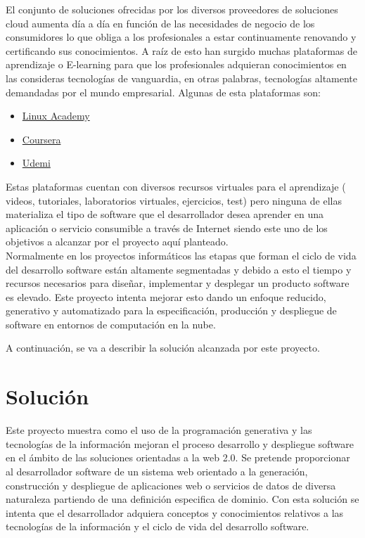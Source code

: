 \documentclass[a4paper,11pt]{book}
\begin{document}
El conjunto de soluciones ofrecidas por los diversos proveedores de soluciones cloud aumenta día a día en función de las necesidades de negocio de los consumidores lo que obliga a los profesionales a estar continuamente renovando y certificando sus conocimientos. A raíz de esto han surgido muchas plataformas de aprendizaje o E-learning para que los profesionales adquieran conocimientos en las consideras tecnologías de vanguardia,  en otras palabras, tecnologías altamente demandadas por el mundo empresarial. Algunas de esta plataformas son:

\begin{itemize}
\item \href{https://linuxacademy.com/}{Linux Academy}
\item \href{https://es.coursera.org/}{Coursera}
\item \href{https://www.udemy.com}{Udemi}
\end{itemize}

Estas plataformas cuentan con diversos recursos virtuales para el aprendizaje ( videos, tutoriales, laboratorios virtuales, ejercicios, test) pero ninguna de ellas materializa el tipo de software que el desarrollador desea aprender en una aplicación o servicio consumible a través de Internet siendo este uno de los objetivos a alcanzar por el proyecto aquí planteado. \\


Normalmente en los proyectos informáticos las etapas que forman el ciclo de vida del desarrollo software están altamente segmentadas y debido a esto el tiempo y recursos necesarios para diseñar, implementar y desplegar un producto software es elevado.  Este proyecto intenta mejorar esto dando un enfoque reducido, generativo y automatizado para la especificación, producción y despliegue de software en entornos de computación en la nube.  

A continuación, se va a describir la solución alcanzada por este proyecto. 

\section{Solución}

Este proyecto muestra como el uso de la programación generativa y las tecnologías de la información mejoran el proceso desarrollo y despliegue software en el ámbito de las soluciones orientadas a la web 2.0. Se pretende proporcionar al desarrollador software de un sistema web orientado a la generación, construcción y despliegue de aplicaciones web o servicios de datos de diversa naturaleza partiendo de una definición especifica de dominio. Con esta solución se intenta que el desarrollador adquiera conceptos y conocimientos relativos a las tecnologías de la información y el ciclo de vida del desarrollo software.  \\
\end{document}
